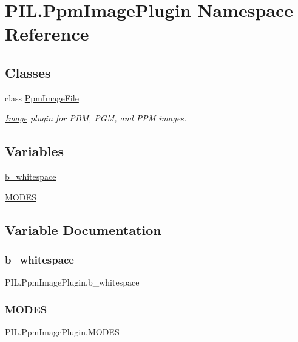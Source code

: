\hypertarget{namespacePIL_1_1PpmImagePlugin}{}\section{P\+I\+L.\+Ppm\+Image\+Plugin Namespace Reference}
\label{namespacePIL_1_1PpmImagePlugin}
\subsection*{Classes}
\begin{DoxyCompactItemize}
\item 
class \hyperlink{classPIL_1_1PpmImagePlugin_1_1PpmImageFile}{Ppm\+Image\+File}
\begin{DoxyCompactList}\small\item\em \hyperlink{namespacePIL_1_1Image}{Image} plugin for P\+BM, P\+GM, and P\+PM images. \end{DoxyCompactList}\end{DoxyCompactItemize}
\subsection*{Variables}
\begin{DoxyCompactItemize}
\item 
\hyperlink{namespacePIL_1_1PpmImagePlugin_afb49a72f284d61f80177d21213ec40be}{b\+\_\+whitespace}
\item 
\hyperlink{namespacePIL_1_1PpmImagePlugin_ae25cbe343e269bda575c434bc894d3fe}{M\+O\+D\+ES}
\end{DoxyCompactItemize}


\subsection{Variable Documentation}
\mbox{\label{namespacePIL_1_1PpmImagePlugin_afb49a72f284d61f80177d21213ec40be}} 
\subsubsection{\texorpdfstring{b\+\_\+whitespace}{b\_whitespace}}
{\footnotesize\ttfamily P\+I\+L.\+Ppm\+Image\+Plugin.\+b\+\_\+whitespace}

\mbox{\label{namespacePIL_1_1PpmImagePlugin_ae25cbe343e269bda575c434bc894d3fe}} 
\subsubsection{\texorpdfstring{M\+O\+D\+ES}{MODES}}
{\footnotesize\ttfamily P\+I\+L.\+Ppm\+Image\+Plugin.\+M\+O\+D\+ES}


